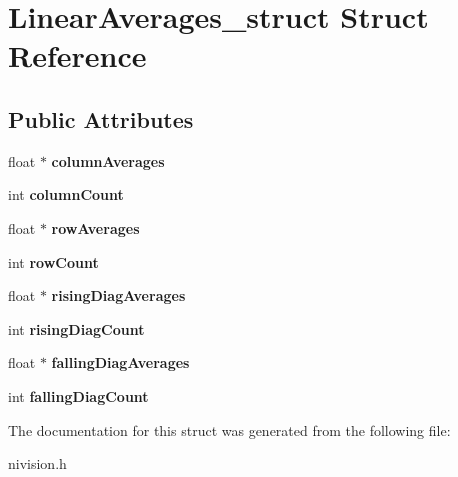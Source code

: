 \hypertarget{structLinearAverages__struct}{\section{\-Linear\-Averages\-\_\-struct \-Struct \-Reference}
\label{structLinearAverages__struct}
}
\subsection*{\-Public \-Attributes}
\begin{DoxyCompactItemize}
\item 
\hypertarget{structLinearAverages__struct_abcb74185a6cc50e70923c3445f26e785}{float $\ast$ {\bfseries column\-Averages}}\label{structLinearAverages__struct_abcb74185a6cc50e70923c3445f26e785}

\item 
\hypertarget{structLinearAverages__struct_a44d09132edc2e46b224f7f0a60d1d056}{int {\bfseries column\-Count}}\label{structLinearAverages__struct_a44d09132edc2e46b224f7f0a60d1d056}

\item 
\hypertarget{structLinearAverages__struct_abb44aa6dc61e9feb14439fcb1a39805c}{float $\ast$ {\bfseries row\-Averages}}\label{structLinearAverages__struct_abb44aa6dc61e9feb14439fcb1a39805c}

\item 
\hypertarget{structLinearAverages__struct_ae5b7d3ae7991c1be519a29c17bb9762e}{int {\bfseries row\-Count}}\label{structLinearAverages__struct_ae5b7d3ae7991c1be519a29c17bb9762e}

\item 
\hypertarget{structLinearAverages__struct_a2186b12ab88468a34ae8c9080e375331}{float $\ast$ {\bfseries rising\-Diag\-Averages}}\label{structLinearAverages__struct_a2186b12ab88468a34ae8c9080e375331}

\item 
\hypertarget{structLinearAverages__struct_aa217809c05f17264cf0ce1adae1f2dd2}{int {\bfseries rising\-Diag\-Count}}\label{structLinearAverages__struct_aa217809c05f17264cf0ce1adae1f2dd2}

\item 
\hypertarget{structLinearAverages__struct_aa9f5bd7777d4a1b815d729859b95abe9}{float $\ast$ {\bfseries falling\-Diag\-Averages}}\label{structLinearAverages__struct_aa9f5bd7777d4a1b815d729859b95abe9}

\item 
\hypertarget{structLinearAverages__struct_a06787a2dea9d82b145728ad44999a502}{int {\bfseries falling\-Diag\-Count}}\label{structLinearAverages__struct_a06787a2dea9d82b145728ad44999a502}

\end{DoxyCompactItemize}


\-The documentation for this struct was generated from the following file\-:\begin{DoxyCompactItemize}
\item 
nivision.\-h\end{DoxyCompactItemize}
